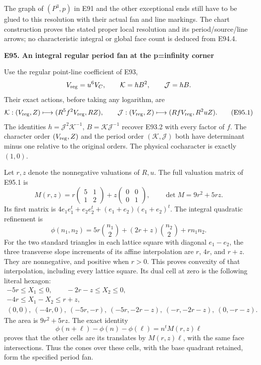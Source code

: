 The graph of \((P^3,p)\) in E91 and the other
exceptional ends still have to be glued to this
resolution with their actual fan and line markings.
The chart construction proves the stated proper local
resolution and its period/source/line arrows; no
characteristic integral or global face count is
deduced from E94.4.

\par

\medskip\noindent\textbf{E95. An integral regular period fan at the p=infinity corner}

\par\nobreak

Use the regular point-line coefficient of E93,
\[
 V_{\rm reg}=u^6V_C,\qquad \mathcal K=hB^2,\qquad
 \mathcal J=hB.
\]
Their exact actions, before taking any logarithm, are
\[
 \mathcal K:(V_{\rm reg},Z)\longmapsto
       (R^5f^2V_{\rm reg},RZ),\qquad
 \mathcal J:(V_{\rm reg},Z)\longmapsto
       (RfV_{\rm reg},R^2uZ).                  \tag{E95.1}
\]
The identities \(h=\mathcal J^2\mathcal K^{-1}\),
\(B=\mathcal K\mathcal J^{-1}\) recover E93.2 with
every factor of \(f\). The character order
\((V_{\rm reg},Z)\) and the period order
\((\mathcal K,\mathcal J)\) both have determinant
minus one relative to the original orders. The
physical cocharacter is exactly \((1,0)\).

Let \(r,z\) denote the nonnegative valuations of
\(R,u\). The full valuation matrix of E95.1 is
\[
 M(r,z)=r\begin{pmatrix}5&1\\1&2\end{pmatrix}
       +z\begin{pmatrix}0&0\\0&1\end{pmatrix},
 \qquad \det M=9r^2+5rz.                       \tag{E95.2}
\]
Its first matrix is
\(4e_1e_1^{t}+e_2e_2^{t}+(e_1+e_2)(e_1+e_2)^t\).
The integral quadratic refinement is
\[
 \phi(n_1,n_2)=5r\binom{n_1}{2}
             +(2r+z)\binom{n_2}{2}+rn_1n_2.   \tag{E95.3}
\]
For the two standard triangles in each lattice square
with diagonal \(e_1-e_2\), the three transverse slope
increments of its affine interpolation are \(r\),
\(4r\), and \(r+z\). They are nonnegative, and
positive when \(r>0\). This proves convexity of
that interpolation, including every lattice square.
Its dual cell at zero is the following literal hexagon:
\[
\begin{gathered}
 -5r\le X_1\le0,\qquad -2r-z\le X_2\le0,\\
 -4r\le X_1-X_2\le r+z,\\
 (0,0),\ (-4r,0),\ (-5r,-r),\
 (-5r,-2r-z),\ (-r,-2r-z),\ (0,-r-z).
\end{gathered}                                                  \tag{E95.4}
\]
The area is \(9r^2+5rz\). The exact identity
\[
 \phi(n+\ell)-\phi(n)-\phi(\ell)=n^tM(r,z)\ell
\]
proves that the other cells are its translates by
\(M(r,z)\ell\), with the same face intersections.
Thus the cones over these cells, with the base
quadrant retained, form the specified period fan.

